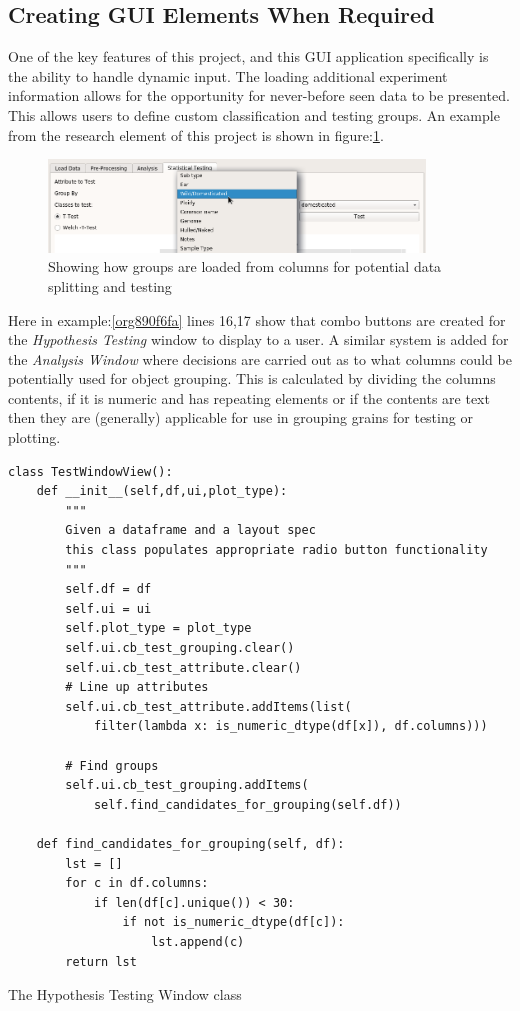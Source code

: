 \documentclass[11pt]{report}
\begin{document}
\subsection{Creating GUI Elements When Required}
\label{sec:orgbda7337}

One of the key features of this project, and this GUI application specifically is the ability to handle dynamic input. The loading additional experiment information allows for the opportunity for never-before seen data to be presented. This allows users to define custom classification and testing groups. An example from the research element of this project is shown in figure:\ref{fig:org4e61090}.

\begin{figure}[htbp]
\centering
\includegraphics[width=10cm]{./images/dynamicselection.png}
\caption{\label{fig:org4e61090}
Showing how groups are loaded from columns for potential data splitting and testing}
\end{figure}

Here in example:\ref{org890f6fa} lines 16,17 show that combo buttons are created for the \emph{Hypothesis Testing} window to display to a user. A similar system is added for the \emph{Analysis Window} where decisions are carried out as to what columns could be potentially used for object grouping. This is calculated by dividing the columns contents, if it is numeric and has repeating elements or if the contents are text then they are (generally) applicable for use in grouping grains for testing or plotting.

\begin{listing}[htbp]
\begin{verbatim}
class TestWindowView():
    def __init__(self,df,ui,plot_type):
        """
        Given a dataframe and a layout spec
        this class populates appropriate radio button functionality
        """
        self.df = df
        self.ui = ui
        self.plot_type = plot_type
        self.ui.cb_test_grouping.clear()
        self.ui.cb_test_attribute.clear()
        # Line up attributes
        self.ui.cb_test_attribute.addItems(list(
            filter(lambda x: is_numeric_dtype(df[x]), df.columns)))

        # Find groups
        self.ui.cb_test_grouping.addItems(
            self.find_candidates_for_grouping(self.df))

    def find_candidates_for_grouping(self, df):
        lst = []
        for c in df.columns:
            if len(df[c].unique()) < 30:
                if not is_numeric_dtype(df[c]):
                    lst.append(c)
        return lst
\end{verbatim}
\caption{\label{org890f6fa}
The Hypothesis Testing Window class}
\end{listing}
\end{document}
